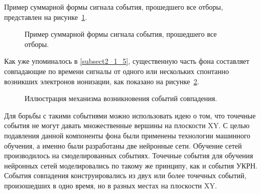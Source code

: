 Пример суммарной формы сигнала события, прошедшего все отборы, представлен на рисунке~\ref{img:event_example}.
\begin{figure}[H]
	\caption{Пример суммарной формы сигнала события, прошедшего все отборы.}
	\label{img:event_example}
\end{figure}

Как уже упоминалось в \ref{subsect2_1_5}, существенную часть фона составляет совпадающие по времени сигналы от одного или нескольких спонтанно возникших электронов ионизации, как показано на рисунке~\ref{img:overlap}.
\begin{figure}[H]
	\caption{Иллюстрация механизма возникновения событий совпадения.}
	\label{img:overlap}
\end{figure}

Для борьбы с такими событиями можно использовать идею о том, что точечные события не могут давать множественные вершины на плоскости XY. С целью подавления данной компоненты фона были применены технологии машинного обучения, а именно были разработаны две нейронные сети. Обучение сетей производилось на смоделированных событиях.
Точечные события для обучения нейронных сетей моделировались по такому же принципу, как и события УКРН. События совпадения конструировались из двух или более точечных событий, произошедших в одно время, но в разных местах на плоскости XY.

